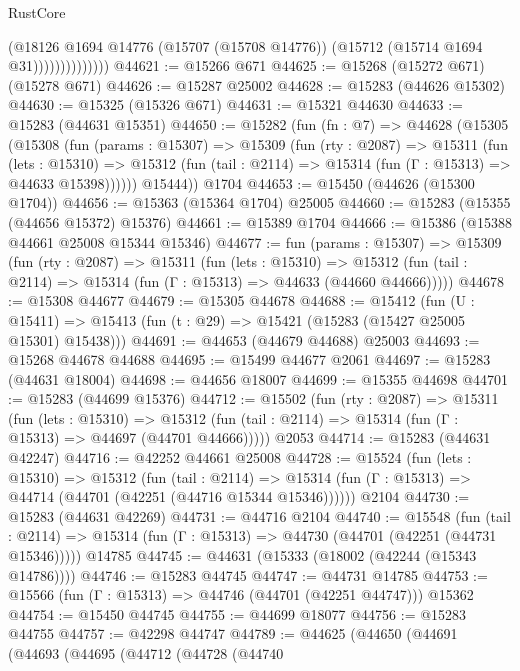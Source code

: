 \begin{lexlean}{RustCore}
\begin{coremodule}
                          (@18126
                            @1694
                            @14776
                            (@15707 (@15708 @14776))
                            (@15712 (@15714 @1694 @31))))))))))))))
@44621 := @15266 @671
@44625 := @15268 (@15272 @671) (@15278 @671)
@44626 := @15287 @25002
@44628 := @15283 (@44626 @15302)
@44630 := @15325 (@15326 @671)
@44631 := @15321 @44630
@44633 := @15283 (@44631 @15351)
@44650 := @15282
    (fun (fn : @7) =>
    @44628
      (@15305
        (@15308
          (fun (params : @15307) =>
          @15309
            (fun (rty : @2087) =>
            @15311
              (fun (lets : @15310) =>
              @15312 (fun (tail : @2114) => @15314 (fun (Γ : @15313) => @44633 @15398))))))
        @15444))
    @1704
@44653 := @15450 (@44626 (@15300 @1704))
@44656 := @15363 (@15364 @1704) @25005
@44660 := @15283 (@15355 (@44656 @15372) @15376)
@44661 := @15389 @1704
@44666 := @15386 (@15388 @44661 @25008 @15344 @15346)
@44677 := fun (params : @15307) =>
  @15309
    (fun (rty : @2087) =>
    @15311
      (fun (lets : @15310) =>
      @15312 (fun (tail : @2114) => @15314 (fun (Γ : @15313) => @44633 (@44660 @44666)))))
@44678 := @15308 @44677
@44679 := @15305 @44678
@44688 := @15412
    (fun (U : @15411) => @15413 (fun (t : @29) => @15421 (@15283 (@15427 @25005 @15301) @15438)))
@44691 := @44653 (@44679 @44688) @25003
@44693 := @15268 @44678 @44688
@44695 := @15499 @44677 @2061
@44697 := @15283 (@44631 @18004)
@44698 := @44656 @18007
@44699 := @15355 @44698
@44701 := @15283 (@44699 @15376)
@44712 := @15502
    (fun (rty : @2087) =>
    @15311
      (fun (lets : @15310) =>
      @15312 (fun (tail : @2114) => @15314 (fun (Γ : @15313) => @44697 (@44701 @44666)))))
    @2053
@44714 := @15283 (@44631 @42247)
@44716 := @42252 @44661 @25008
@44728 := @15524
    (fun (lets : @15310) =>
    @15312
      (fun (tail : @2114) =>
      @15314 (fun (Γ : @15313) => @44714 (@44701 (@42251 (@44716 @15344 @15346))))))
    @2104
@44730 := @15283 (@44631 @42269)
@44731 := @44716 @2104
@44740 := @15548
    (fun (tail : @2114) => @15314 (fun (Γ : @15313) => @44730 (@44701 (@42251 (@44731 @15346)))))
    @14785
@44745 := @44631 (@15333 (@18002 (@42244 (@15343 @14786))))
@44746 := @15283 @44745
@44747 := @44731 @14785
@44753 := @15566 (fun (Γ : @15313) => @44746 (@44701 (@42251 @44747))) @15362
@44754 := @15450 @44745
@44755 := @44699 @18077
@44756 := @15283 @44755
@44757 := @42298 @44747
@44789 := @44625
    (@44650
      (@44691
        (@44693
          (@44695
            (@44712
              (@44728
                (@44740

\end{coremodule}
\end{lexlean}
